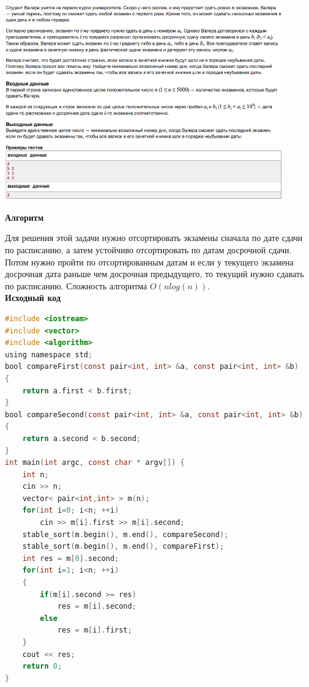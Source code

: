 \documentclass[a4paper,12pt]{article}
\begin{document}
\begin{center}
\includegraphics[width=0.9\textwidth]{C_274/C_274_C.png}\\ [1cm]
\end{center}

\newpage
\textbf{{\large Алгоритм}}

Для решения этой задачи нужно отсортировать экзамены сначала по дате сдачи по расписанию, а затем устойчиво отсортировать по датам досрочной сдачи. Потом нужно пройти по отсортированным датам и если у текущего экзамена досрочная дата раньше чем досрочная предыдущего, то текущий нужно сдавать по расписанию. Сложность алгоритма $O(nlog(n))$.\\

\textbf{{\large Исходный код}} \\
\begin{lstlisting}[language=C]
#include <iostream>
#include <vector>
#include <algorithm>
using namespace std;
bool compareFirst(const pair<int, int> &a, const pair<int, int> &b)
{
    return a.first < b.first;
}
bool compareSecond(const pair<int, int> &a, const pair<int, int> &b)
{
    return a.second < b.second;
}
int main(int argc, const char * argv[]) {
    int n;
    cin >> n;
    vector< pair<int,int> > m(n);
    for(int i=0; i<n; ++i)
        cin >> m[i].first >> m[i].second;
    stable_sort(m.begin(), m.end(), compareSecond);
    stable_sort(m.begin(), m.end(), compareFirst);
    int res = m[0].second;
    for(int i=1; i<n; ++i)
    {
        if(m[i].second >= res)
            res = m[i].second;
        else
            res = m[i].first;
    }
    cout << res;
    return 0;
}
\end{lstlisting}
\end{document}
